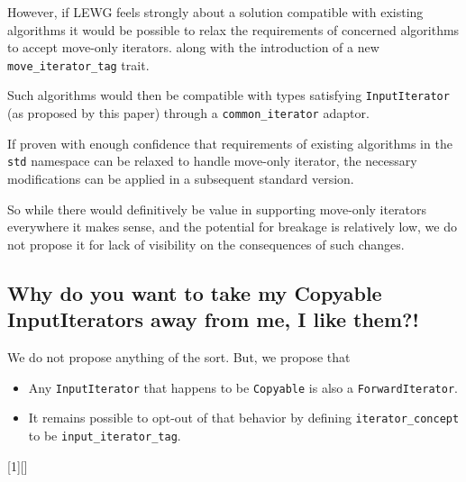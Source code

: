\documentclass{wg21}
\begin{document}
However, if LEWG feels strongly about a solution compatible with
existing algorithms it would be possible to relax the requirements of
concerned algorithms to accept move-only iterators. along with the
introduction of a new \texttt{move\_iterator\_tag} trait.

Such algorithms would then be compatible with types satisfying
\texttt{InputIterator} (as proposed by this paper) through a
\texttt{common\_iterator} adaptor.

If proven with enough confidence that requirements of existing
algorithms in the \texttt{std} namespace can be relaxed to handle
move-only iterator, the necessary modifications can be applied in a
subsequent standard version.

So while there would definitively be value in supporting move-only
iterators everywhere it makes sense, and the potential for breakage is
relatively low, we do not propose it for lack of visibility on the
consequences of such changes.

\hypertarget{why-do-you-want-to-take-my-copyable-inputiterators-away-from-me-i-like-them}{%
	\subsection{Why do you want to take my Copyable InputIterators away from
		me, I like
		them?!}\label{why-do-you-want-to-take-my-copyable-inputiterators-away-from-me-i-like-them}}

We do not propose anything of the sort. But, we propose that
\begin{itemize}
	\item Any \texttt{InputIterator} that happens to be \texttt{Copyable} is also a \texttt{ForwardIterator}.
	\item  It remains possible to opt-out of that behavior by defining \texttt{iterator\_concept} to be
	\texttt{input\_iterator\_tag}.
\end{itemize}

[1][]
{ \lstset{basicstyle=\tiny}{#1} }
{}
\end{document}
